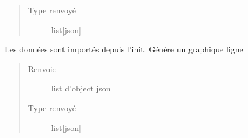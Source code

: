 \documentclass[letterpaper,10pt,french]{sphinxmanual}
\begin{document}
\begin{fulllineitems}
\begin{fulllineitems}
\begin{quote}
\begin{description}
\item[{Type renvoyé}] \leavevmode
\sphinxAtStartPar
list{[}json{]}

\end{description}\end{quote}

\end{fulllineitems}


\begin{fulllineitems}
\label{\detokenize{app.home.content_gen:app.home.content_gen.graph_generation.FinancialChart.plot_sgl_line}}
\sphinxAtStartPar
Les données sont importés depuis l’init. Génère un graphique ligne
\begin{quote}\begin{description}
\item[{Renvoie}] \leavevmode
\sphinxAtStartPar
list d’object json

\item[{Type renvoyé}] \leavevmode
\sphinxAtStartPar
list{[}json{]}

\end{description}\end{quote}

\end{fulllineitems}


\end{fulllineitems}

\end{document}
